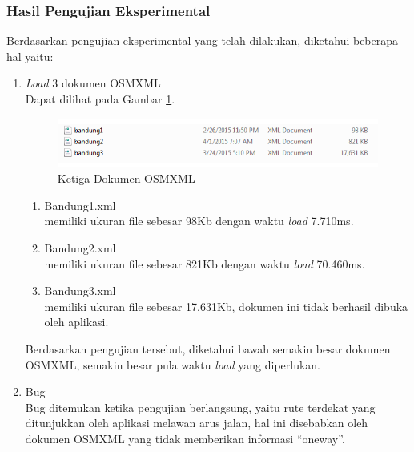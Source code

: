 \subsubsection{Hasil Pengujian Eksperimental}
Berdasarkan pengujian eksperimental yang telah dilakukan, diketahui beberapa hal
yaitu:
\begin{enumerate}
  \item \textit{Load} 3 dokumen OSMXML\\
  Dapat dilihat pada Gambar \ref{fig:doc_xml}.
\begin{figure}[h]
\centering
\includegraphics[scale=1]{Gambar/doc_xml}
\caption[Ketiga Dokumen OSMXML]{Ketiga Dokumen OSMXML}
\label{fig:doc_xml}
\end{figure}
  \begin{enumerate}
    \item Bandung1.xml\\
    memiliki ukuran file sebesar 98Kb dengan waktu \textit{load} 7.710ms.
    
    \item Bandung2.xml\\
    memiliki ukuran file sebesar 821Kb dengan waktu \textit{load} 70.460ms.
    
    \item Bandung3.xml\\
    memiliki ukuran file sebesar 17,631Kb, dokumen ini tidak berhasil dibuka
    oleh aplikasi.
  \end{enumerate}
  Berdasarkan pengujian tersebut, diketahui bawah semakin besar dokumen OSMXML,
  semakin besar pula waktu \textit{load} yang diperlukan.
  
  \item Bug\\
  Bug ditemukan ketika pengujian berlangsung, yaitu rute terdekat yang
  ditunjukkan oleh aplikasi melawan arus jalan, hal ini disebabkan oleh dokumen
  OSMXML yang tidak memberikan informasi ``oneway''.
\end{enumerate}











